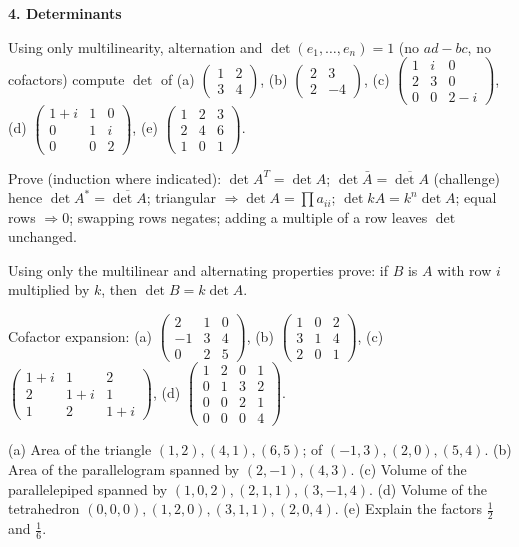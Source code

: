 \documentclass[9pt]{article}
\newcommand{\sub}[1]{\vspace{3pt}\par{\bfseries\color{NAVY}#1}\nopagebreak\par}
\newcommand{\bi}[2]{\par\noindent\hangindent=1.25cm\hangafter=1\makebox[1.25cm][l]{\textbf{\footnotesize #1}}#2\par}
\begin{document}
\sub{4. Determinants}
\bi{DT1}{Using only multilinearity, alternation and $\det(e_1,\dots,e_n)=1$ (no $ad-bc$, no cofactors) compute $\det$ of (a) $\begin{pmatrix}1&2\\3&4\end{pmatrix}$, (b) $\begin{pmatrix}2&3\\2&-4\end{pmatrix}$, (c) $\begin{pmatrix}1&i&0\\2&3&0\\0&0&2{-}i\end{pmatrix}$, (d) $\begin{pmatrix}1{+}i&1&0\\0&1&i\\0&0&2\end{pmatrix}$, (e) $\begin{pmatrix}1&2&3\\2&4&6\\1&0&1\end{pmatrix}$.}
\bi{DT2}{Prove (induction where indicated): $\det A^T=\det A$; $\det\bar A=\overline{\det A}$ (challenge) hence $\det A^*=\overline{\det A}$; triangular $\Rightarrow\det A=\prod a_{ii}$; $\det kA=k^n\det A$; equal rows $\Rightarrow0$; swapping rows negates; adding a multiple of a row leaves $\det$ unchanged.}
\bi{DT3}{Using only the multilinear and alternating properties prove: if $B$ is $A$ with row $i$ multiplied by $k$, then $\det B=k\det A$.}
\bi{DT4}{Cofactor expansion: (a) $\begin{pmatrix}2&1&0\\-1&3&4\\0&2&5\end{pmatrix}$, (b) $\begin{pmatrix}1&0&2\\3&1&4\\2&0&1\end{pmatrix}$, (c) $\begin{pmatrix}1{+}i&1&2\\2&1{+}i&1\\1&2&1{+}i\end{pmatrix}$, (d) $\begin{pmatrix}1&2&0&1\\0&1&3&2\\0&0&2&1\\0&0&0&4\end{pmatrix}$.}
\bi{DT5}{(a) Area of the triangle $(1,2),(4,1),(6,5)$; of $(-1,3),(2,0),(5,4)$. (b) Area of the parallelogram spanned by $(2,-1),(4,3)$. (c) Volume of the parallelepiped spanned by $(1,0,2),(2,1,1),(3,-1,4)$. (d) Volume of the tetrahedron $(0,0,0),(1,2,0),(3,1,1),(2,0,4)$. (e) Explain the factors $\tfrac12$ and $\tfrac16$.}
\end{document}
